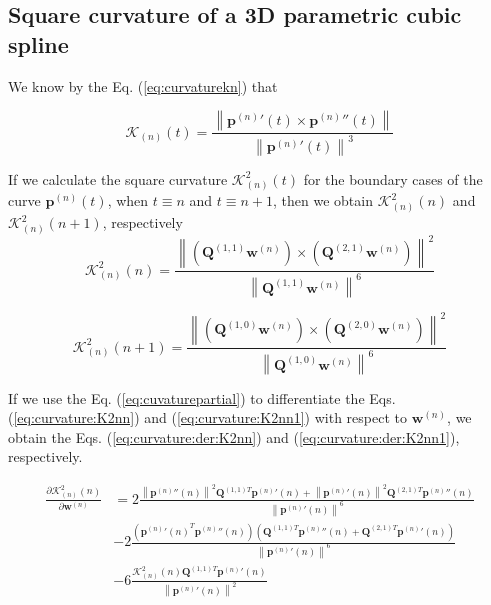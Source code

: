 \subsection{Square curvature of a 3D parametric cubic spline}
\label{sec:curvaturemain}
We know by the Eq. (\ref{eq:curvaturekn}) that

\begin{equation}
\mathcal{K}_{(n)}(t)
=
\frac{\left\|{\mathbf{p}^{(n)}}'(t) \times {\mathbf{p}^{(n)}}''(t) \right\|}
{\left\|{\mathbf{p}^{(n)}}'(t)\right\|^{3}}
\end{equation}

If we calculate the square curvature $\mathcal{K}_{(n)}^{2}(t)$ for the boundary cases of the curve $\mathbf{p}^{(n)}(t)$, 
when $t\equiv n$ and $t\equiv n+1$,
then we obtain $\mathcal{K}_{(n)}^{2}(n)$ and $\mathcal{K}_{(n)}^{2}(n+1)$, respectively
\begin{equation}\label{eq:curvature:K2nn}
\mathcal{K}_{(n)}^{2}(n)
=
\frac{\left\|
\left( \mathbf{Q}^{(1,1)} \mathbf{w}^{(n)} \right)
\times 
\left( \mathbf{Q}^{(2,1)} \mathbf{w}^{(n)} \right)
\right\|^{2}}
{\left\| \mathbf{Q}^{(1,1)} \mathbf{w}^{(n)} \right\|^{6}}
\end{equation}

\begin{equation}\label{eq:curvature:K2nn1}
\mathcal{K}_{(n)}^{2}(n+1)
=
\frac{\left\|
\left( \mathbf{Q}^{(1,0)} \mathbf{w}^{(n)} \right)
\times 
\left( \mathbf{Q}^{(2,0)} \mathbf{w}^{(n)} \right)
\right\|^{2}}
{\left\| \mathbf{Q}^{(1,0)} \mathbf{w}^{(n)} \right\|^{6}}
\end{equation}


If we use the Eq. (\ref{eq:cuvaturepartial}) to differentiate the Eqs. (\ref{eq:curvature:K2nn}) and (\ref{eq:curvature:K2nn1})
with respect to $\mathbf{w}^{(n)}$, 
we obtain the Eqs. (\ref{eq:curvature:der:K2nn}) and (\ref{eq:curvature:der:K2nn1}), respectively.

\begin{equation}\label{eq:curvature:der:K2nn}
\begin{split}
\frac{
\partial 
\mathcal{K}_{(n)}^{2}(n)
}
{
\partial \mathbf{w}^{(n)}
}
& = 
2
\frac{
\left\|{\mathbf{p}^{(n)}}''(n)\right\|^2
\mathbf{Q}^{(1,1)T} {\mathbf{p}^{(n)}}'(n)
+
\left\|{\mathbf{p}^{(n)}}'(n)\right\|^2
\mathbf{Q}^{(2,1)T} {\mathbf{p}^{(n)}}''(n)
}
{\left\| {\mathbf{p}^{(n)}}'(n) \right\|^{6}}\\[10pt]
& - 
2
\frac
{
\left(
{{\mathbf{p}^{(n)}}'(n)}^{T}
{\mathbf{p}^{(n)}}''(n)
\right)
\left(
\mathbf{Q}^{(1,1)T}{\mathbf{p}^{(n)}}''(n)
+
\mathbf{Q}^{(2,1)T}{\mathbf{p}^{(n)}}'(n)
\right)
}
{\left\| {\mathbf{p}^{(n)}}'(n) \right\|^{6}}\\[10pt]
& - 
6
\frac
{
\mathcal{K}_{(n)}^{2}(n)
\mathbf{Q}^{(1,1)T}{\mathbf{p}^{(n)}}'(n)
}
{\left\| {\mathbf{p}^{(n)}}'(n) \right\|^{2}}
\end{split}
\end{equation}

